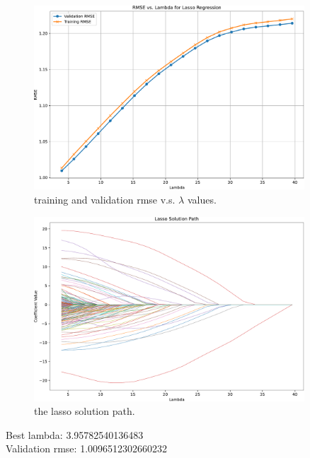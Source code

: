 \documentclass{article}
\begin{document}
\begin{figure}[htbp]
    \begin{center}
        \includegraphics[width=0.9\textwidth]{./figures/lasso_rmse_vs_lambda.pdf}
    \end{center}
    \caption{training and validation rmse v.s. $ \lambda $ values.}\label{fig:}
\end{figure}
\begin{figure}[H]
    \begin{center}
        \includegraphics[width=0.9\textwidth]{./figures/lasso_solution_pathq5.pdf}
    \end{center}
    \caption{the lasso solution path.}\label{fig:}
\end{figure}
\noindent Best lambda: 3.95782540136483 \\ 
Validation rmse: 1.0096512302660232\\
\end{document}
